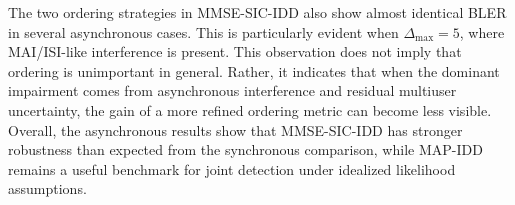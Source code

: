 The two ordering strategies in MMSE-SIC-IDD also show almost identical BLER in several asynchronous cases. This is particularly evident when $\Delta_{\max}=5$, where MAI/ISI-like interference is present. This observation does not imply that ordering is unimportant in general. Rather, it indicates that when the dominant impairment comes from asynchronous interference and residual multiuser uncertainty, the gain of a more refined ordering metric can become less visible. Overall, the asynchronous results show that MMSE-SIC-IDD has stronger robustness than expected from the synchronous comparison, while MAP-IDD remains a useful benchmark for joint detection under idealized likelihood assumptions.
